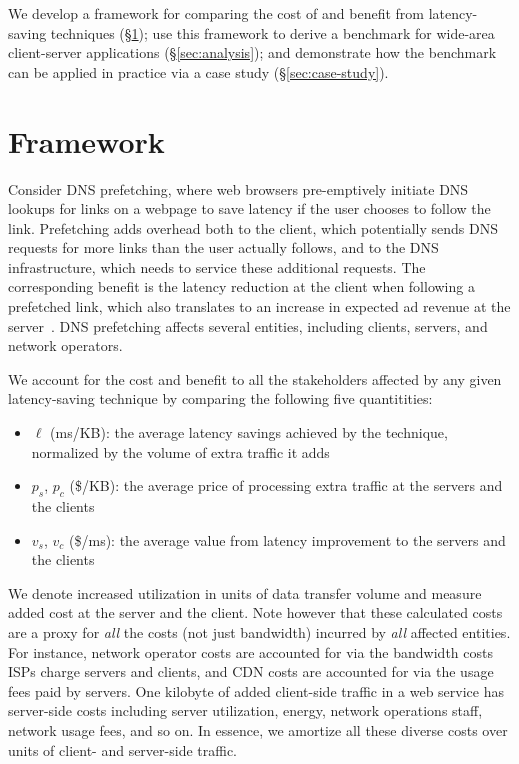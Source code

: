 \documentclass{sigcomm-alternate}
\begin{document}
We develop a framework for comparing the cost of and benefit from latency-saving techniques (\S\ref{sec:framework}); use this framework to derive a benchmark for wide-area client-server applications (\S\ref{sec:analysis}); and demonstrate how the benchmark can be applied in practice via a case study (\S\ref{sec:case-study}).

\section{Framework}
\label{sec:framework}

Consider DNS prefetching, where web browsers pre-emptively initiate DNS lookups for links on a webpage to save latency if the user chooses to follow the link.  Prefetching adds overhead both to the client, which potentially sends DNS requests for more links than the user actually follows, and to the DNS infrastructure, which needs to service these additional requests.  The corresponding benefit is the latency reduction at the client when following a prefetched link, which also translates to an increase in expected ad revenue at the server~\cite{brutlag09}.  DNS prefetching affects several entities, including clients, servers, and network operators.

We account for the cost and benefit to all the stakeholders affected by any given latency-saving technique by comparing the following five quantitities:

\begin{itemize}[noitemsep]
\item $\ell$ (ms/KB): the average latency savings achieved by the technique, normalized by the volume of extra traffic it adds
\item $p_s$, $p_c$ (\$/KB): the average price of processing extra traffic at the servers and the clients
\item $v_s$, $v_c$ (\$/ms): the average value from latency improvement to the servers and the clients
\end{itemize}

We denote increased utilization in units of data transfer volume and measure added cost at the server and the client.   Note however that these calculated costs are a proxy for \emph{all} the costs (not just bandwidth) incurred by \emph{all} affected entities.  For instance, network operator costs are accounted for via the bandwidth costs ISPs charge servers and clients, and CDN costs are accounted for via the usage fees paid by servers.  One kilobyte of added client-side traffic in a web service has server-side costs including server utilization, energy, network operations staff, network usage fees, and so on.  In essence, we amortize all these diverse costs over units of client- and server-side traffic.
\end{document}
